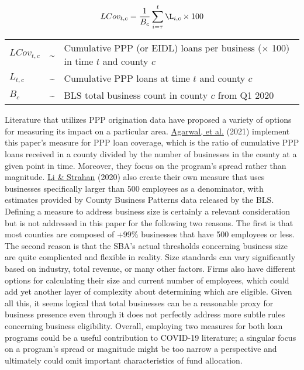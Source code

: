 \documentclass[11pt]{article} %
\begin{document}
\begin{equation}
    LCov_{t,c} = \frac{1}{B_{c}}\sum_{i=\tau}^{t}\L_{i,c} \times 100
\end{equation}
        \begin{center}\begin{tabular}{lll}
        $LCov_{t,c}$ & \sim & Cumulative PPP (or EIDL) loans per business ($\times$ 100) in time $t$ and county $c$ \\
        $L_{t,c}$ & \sim &  Cumulative PPP  loans at time $t$ and county $c$ \\
        ${B_{c}}$ & \sim & BLS total business count in county $c$ from Q1 2020 \\
        \end{tabular}\end{center}

Literature that utilizes PPP origination data have proposed a variety of options for measuring its impact on a particular area. \hyperlink{Agarwal}{Agarwal, et al.} (2021) implement this paper's measure for PPP loan coverage, which is the ratio of cumulative PPP loans received in a county divided by the number of businesses in the county at a given point in time. Moreover, they focus on the program's spread rather than magnitude. \hyperlink{Li}{Li \& Strahan} (2020) also create their own measure that uses businesses specifically larger than 500 employees as a denominator, with estimates provided by County Business Patterns data released by the BLS. Defining a measure to address business size is certainly a relevant consideration but is not addressed in this paper for the following two reasons. The first is that most counties are composed of +99\% businesses that have 500 employees or less. The second reason is that the SBA's actual thresholds concerning business size are quite complicated and flexible in reality. Size standards can vary significantly based on industry, total revenue, or many other factors. Firms also have different options for calculating their size and current number of employees, which could add yet another layer of complexity about determining which are eligible. Given all this, it seems logical that total businesses can be a reasonable proxy for business presence even through it does not perfectly address more subtle rules concerning business eligibility. Overall, employing two measures for both loan programs could be a useful contribution to COVID-19 literature; a singular focus on a program's spread or magnitude might be too narrow a perspective and ultimately could omit important characteristics of fund allocation.
\end{document}
